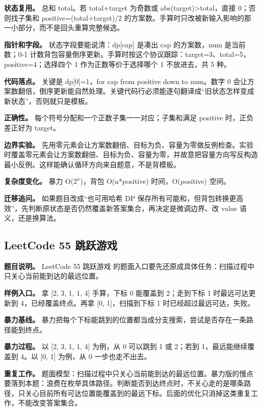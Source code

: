 \textbf{状态复用。} 总和 total。若 total+target 为奇数或 abs(target)>total，直接 0；否则找子集和 positive=(total+target)/2 的方案数。手算时只改被新输入影响的那一小部分，而不是回头重算完整候选。

\textbf{指针和字段。} 状态字段要能说清：dp[cap] 是凑出 cap 的方案数，num 是当前数；0-1 计数背包容量倒序更新。手算时按这个协议跟踪：target=3、total=5，positive=4；选择四个 1 作为正数等价于选择哪个 1 不放进去，共 5 种。

\textbf{代码落点。} 关键是 dp[0]=1，for cap from positive down to num。数字 0 会让方案数翻倍，倒序更新能自然处理。关键代码行必须能逐句翻译成“旧状态怎样变成新状态”，否则就只是模板。

\textbf{正确性。} 每个符号分配和一个正数子集一一对应；子集和满足 positive 时，正负差正好为 target。

\textbf{边界实验。} 先用零元素会让方案数翻倍、目标为负、容量为零做反例检查。实验时覆盖零元素会让方案数翻倍、目标为负、容量为零，并故意把容量方向写反构造最小反例。这样能确认循环方向来自题意，不是背模板。

\textbf{复杂度变化。} 暴力 O(\ensuremath{2^{n}})，背包 O(n*positive) 时间，O(positive) 空间。

\textbf{迁移追问。} 如果题目改成“也可用哈希 DP 保存所有可能和，但背包转换更高效”，先判断原状态是否仍然覆盖新答案集合，再决定是微调边界、改 value 语义，还是换算法。

\subsection{LeetCode 55 跳跃游戏}

\textbf{题目说明。} LeetCode 55 跳跃游戏 的题面入口要先还原成具体任务：扫描过程中只关心当前能到达的最远位置。

\textbf{样例入口。} 拿 [2, 3, 1, 1, 4] 手算，下标 0 能覆盖到 2；走到下标 1 时最远可达更新到 4，已经覆盖终点。再拿 [0, 1]，扫描到下标 1 时已经超过最远可达，失败。

\textbf{暴力基线。} 暴力把每个下标能跳到的位置都当成分支搜索，尝试是否存在一条路径能到终点。

\textbf{暴力过程。} 以 [2, 3, 1, 1, 4] 为例，从 0 可以跳到 1 或 2；若到 1，最远能继续覆盖到 4。以 [0, 1] 为例，从 0 一步也走不出去。

\textbf{重复工作。} 题面模型：扫描过程中只关心当前能到达的最远位置。暴力版的慢点要落到本题：浪费在枚举具体路径。判断能否到达终点时，不关心走的是哪条路径，只关心目前所有可达位置能覆盖到的最远下标。后面的优化只消掉这类重复工作，不能改变答案集合。

